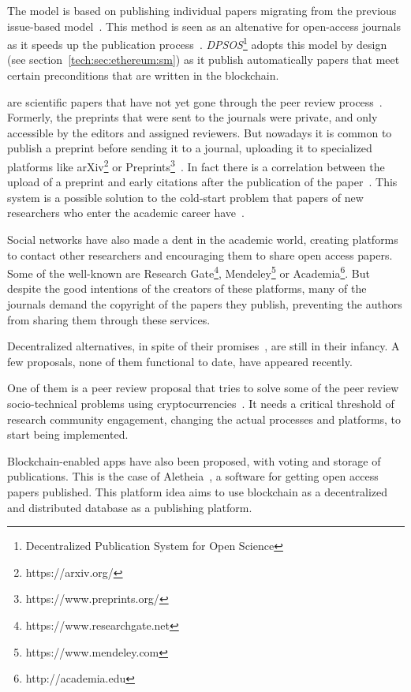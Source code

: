 The  model is based on publishing individual papers
migrating from the previous issue-based model~\cite{anderton2013continuous}.
This method is seen as an altenative for open-access journals as it speeds up
the publication process~\cite{haymanview}. \emph{DPSOS}\footnote{Decentralized
  Publication System for Open Science} adopts this model by design (see
section~\ref{tech:sec:ethereum:sm}) as it publish automatically papers that meet
certain preconditions that are written in the blockchain.

 are scientific papers that have not yet gone through the peer
review process~\cite{harnad2003electronic}. Formerly, the preprints that were
sent to the journals were private, and only accessible by the editors and
assigned reviewers. But nowadays it is common to publish a preprint before
sending it to a journal, uploading it to specialized platforms like
arXiv\footnote{https://arxiv.org/} or
Preprints\footnote{https://www.preprints.org/}~\cite{brown2001volution}. In fact
there is a correlation between the upload of a preprint and early citations
after the publication of the paper~\cite{shuai2012scientific}. This system is a
possible solution to the cold-start problem that papers of new researchers who
enter the academic career have~\cite{sugiyama2010scholarly}.

Social networks have also made a dent in the academic world, creating platforms
to contact other researchers and encouraging them to share open access papers.
Some of the well-known are Research Gate\footnote{https://www.researchgate.net},
Mendeley\footnote{https://www.mendeley.com} or
Academia\footnote{http://academia.edu}. But despite the good intentions of the
creators of these platforms, many of the journals demand the copyright of the
papers they publish, preventing the authors from sharing them through these
services.


Decentralized alternatives, in spite of their
promises~\cite{bartlingblockchain}, are still in their infancy. A few proposals,
none of them functional to date, have appeared recently.

One of them is a peer review proposal that tries to solve some of the peer
review socio-technical problems using cryptocurrencies~\cite{tennant2017multi}.
It needs a critical threshold of research community engagement, changing the
actual processes and platforms, to start being implemented.

Blockchain-enabled apps have also been proposed, with voting and storage of
publications. This is the case of Aletheia~\cite{morton2017aletheia}, a software
for getting open access papers published. This platform idea aims to use
blockchain as a decentralized and distributed database as a publishing platform.

